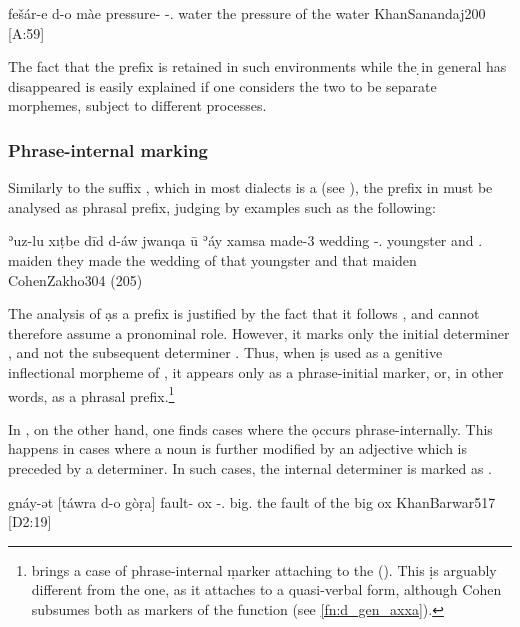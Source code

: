 {fešár-e d-o màe}
{pressure-\ez{} \gen-\dem.\masc{} water}
{the pressure of the water}
{KhanSanandaj}{200 {[A:59]}}

The fact that the \d prefix is retained in such environments while the \d \lnk* in general has disappeared is easily explained if one considers the two to be separate morphemes, subject to different  processes. 

\subsubsection{Phrase-internal marking}

Similarly to the \cst* suffix \ed, which in most dialects is a  (see ), the \gen* \d prefix in  \JZax must be analysed as phrasal prefix, 
judging by examples such as the following:


{ʾuz-lu xıṭbe dīd d-áw jwanqa ū\cb{} ʾáy xamsa}
{made-3\pl{} wedding \lnk{} \gen-.\masc{} youngster and\cb{} .\fem{} maiden}
{they made the wedding of that youngster and that maiden}
{CohenZakho}{304 (205)}

The analysis of \d as a \gen* prefix is justified by the fact that it follows  \lnk* {}, and cannot therefore assume a pronominal role. However, it marks only the initial determiner , and not the subsequent determiner . Thus, when \d is used as a genitive  inflectional morpheme of , it appears only as a phrase-initial marker, or, in other words, as a phrasal prefix.\footnote{\citet{CohenZakho} brings a case of phrase-internal \d marker attaching to the  (). This \d is arguably different from the \gen* one, as it attaches to a quasi-verbal form, although Cohen subsumes both as markers of the  function (see \vref{fn:d_gen_axxa}).}

In \Barw, on the other hand, one finds cases where the \gen* \d occurs phrase-internally. This happens in cases where a \secn noun is further modified by an adjective which is preceded by a determiner. In such cases, the internal determiner is marked as \gen*.

{gnáy-ət [táwra d-o\cb{} gòṛa]}
{fault-\cst{} \hspace{0.7ex}ox \gen-.\masc\cb{} big.\masc}
{the fault of the big ox}
{KhanBarwar}{517 {[D2:19]}}

